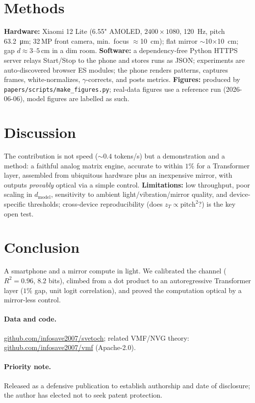 \documentclass[11pt]{article}
\begin{document}
\section{Methods}
\textbf{Hardware:} Xiaomi 12 Lite (6.55" AMOLED, $2400\times1080$, \SI{120}{\hertz}, pitch
\SI{63.2}{\micro\meter}; 32\,MP front camera, min.\ focus $\approx$\SI{10}{\centi\meter});
flat mirror $\sim$\SI{10}{}$\times$\SI{10}{\centi\meter}; gap $d\approx 3\text{--}5$\,cm in a
dim room. \textbf{Software:} a dependency-free Python HTTPS server relays Start/Stop to the
phone and stores runs as JSON; experiments are auto-discovered browser ES modules; the phone
renders patterns, captures frames, white-normalizes, $\gamma$-corrects, and posts metrics.
\textbf{Figures:} produced by \texttt{papers/scripts/make\_figures.py}; real-data figures use
a reference run (2026-06-06), model figures are labelled as such.

\section{Discussion}
The contribution is not speed ($\sim\!0.4$ tokens/s) but a demonstration and a method: a
faithful analog matrix engine, accurate to within $1\%$ for a Transformer layer, assembled
from ubiquitous hardware plus an inexpensive mirror, with outputs \emph{provably} optical via a simple
control. \textbf{Limitations:} low throughput, poor scaling in $d_\text{model}$, sensitivity
to ambient light/vibration/mirror quality, and device-specific thresholds; cross-device
reproducibility (does $z_T \propto \text{pitch}^2$?) is the key open test.

\section{Conclusion}
A smartphone and a mirror compute in light. We calibrated the channel ($R^2=0.96$, $8.2$
bits), climbed from a dot product to an autoregressive Transformer layer ($1\%$ gap, unit
logit correlation), and proved the computation optical by a mirror-less control.

\paragraph{Data and code.} \href{https://github.com/infosave2007/svetoch}{github.com/infosave2007/svetoch}; related VMF/NVG theory: \href{https://github.com/infosave2007/vmf}{github.com/infosave2007/vmf}
(Apache-2.0).
\paragraph{Priority note.} Released as a defensive publication to establish authorship and
date of disclosure; the author has elected not to seek patent protection.
\end{document}
